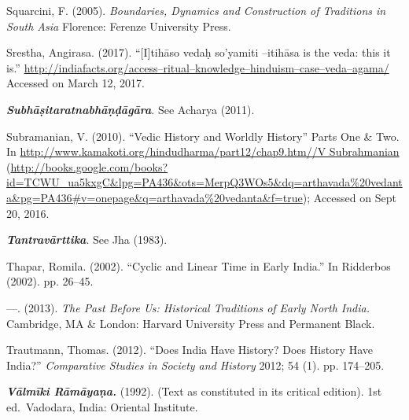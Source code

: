 \begin{thebibliography}{99}
  Squarcini, F. (2005). \textit{Boundaries, Dynamics and Construction of Traditions in South Asia} Florence: Ferenze University Press.

  Srestha, Angirasa. (2017). “[I]tihāso vedaḥ so’yamiti –itihāsa is the veda: this it is.” \url{http://indiafacts.org/access–ritual–knowledge–hinduism–case–veda–agama/} Accessed on March 12, 2017.

  \textbf{\textit{Subhāṣitaratnabhāṇḍāgāra}}. See Acharya (2011).

  Subramanian, V. (2010). “Vedic History and Worldly History” Parts One \& Two. In \url{http://www.kamakoti.org/hindudharma/part12/chap9.htm//V Subrahmanian} (\url{http://books.google.com/books?id=TCWU_ua5kxgC&lpg=PA436&ots=MerpQ3WOs5&dq=arthavada%20vedanta&pg=PA436#v=onepage&q=arthavada%20vedanta&f=true}); Accessed on Sept 20, 2016.

  \textbf{\textit{Tantravārttika}}. See Jha (1983).

  Thapar, Romila. (2002). “Cyclic and Linear Time in Early India.” In Ridderbos (2002). pp. 26–45.

  —. (2013). \textit{The Past Before Us: Historical Traditions of Early North India.} Cambridge, MA \& London: Harvard University Press and Permanent Black.

  Trautmann, Thomas. (2012). “Does India Have History? Does History Have India?” \textit{Comparative Studies in Society and History} 2012; 54 (1). pp. 174–205.

  \textbf{\textit{Vālmīki Rāmāyaṇa.}} (1992). (Text as constituted in its critical edition). 1st ed.\ Vadodara, India: Oriental Institute.

 \end{thebibliography}

